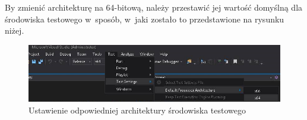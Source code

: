 By zmienić architekturę na 64-bitową, należy przestawić jej wartość domyślną dla środowiska testowego w~sposób, w~jaki zostało to przedstawione na rysunku niżej.

\begin{figure}[H]
	\includegraphics[width=15cm]{img/UnitTests_x64_architecture.png}
	\caption{Ustawienie odpowiedniej architektury środowiska testowego}
\end{figure}
